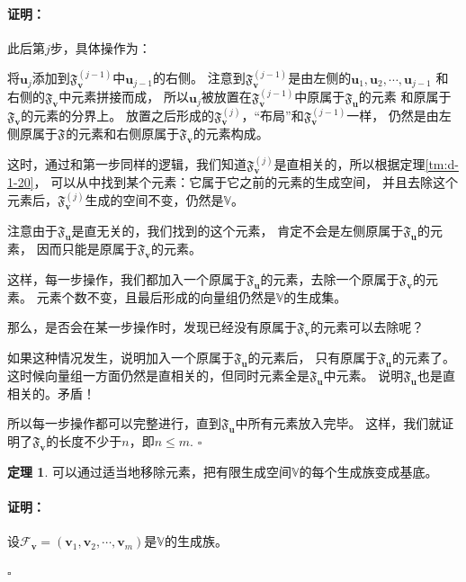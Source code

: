 \documentclass[12pt,UTF8]{ctexbook}
\theoremstyle{definition}
\newtheorem{tm}{定理}[section]
\theoremstyle{plain}
\renewenvironment{proof}{\paragraph{\textbf{证明：}}}{\hfill$\square$}
\begin{document}
\begin{appendix}
\begin{proof}
    此后第$j$步，具体操作为：

    将$\mathbf{u}_j$添加到$\mathfrak{F}_{\mathbf{v}}^{(j-1)}$中$\mathbf{u}_{j-1}$的右侧。
    注意到$\mathfrak{F}_{\mathbf{v}}^{(j-1)}$是由左侧的$\mathbf{u}_1, \mathbf{u}_2, \cdots , \mathbf{u}_{j-1}$
    和右侧的$\mathfrak{F}_{\mathbf{v}}$中元素拼接而成，
    所以$\mathbf{u}_j$被放置在$\mathfrak{F}_{\mathbf{v}}^{(j-1)}$中原属于$\mathfrak{F}_{\mathbf{u}}$的元素
    和原属于$\mathfrak{F}_{\mathbf{v}}$的元素的分界上。
    放置之后形成的$\mathfrak{F}_{\mathbf{v}}^{(j)}$，“布局”和$\mathfrak{F}_{\mathbf{v}}^{(j-1)}$一样，
    仍然是由左侧原属于$\mathfrak{F}_{\mathbf{}}$的元素和右侧原属于$\mathfrak{F}_{\mathbf{v}}$的元素构成。
    
    这时，通过和第一步同样的逻辑，我们知道$\mathfrak{F}_{\mathbf{v}}^{(j)}$是直相关的，所以根据定理\ref{tm:d-1-20}，
    可以从中找到某个元素：它属于它之前的元素的生成空间，
    并且去除这个元素后，$\mathfrak{F}_{\mathbf{v}}^{(j)}$生成的空间不变，仍然是$\mathbb{V}$。

    注意由于$\mathfrak{F}_{\mathbf{u}}$是直无关的，我们找到的这个元素，
    肯定不会是左侧原属于$\mathfrak{F}_{\mathbf{u}}$的元素，
    因而只能是原属于$\mathfrak{F}_{\mathbf{v}}$的元素。

    这样，每一步操作，我们都加入一个原属于$\mathfrak{F}_{\mathbf{u}}$的元素，去除一个原属于$\mathfrak{F}_{\mathbf{v}}$的元素。
    元素个数不变，且最后形成的向量组仍然是$\mathbb{V}$的生成集。

    那么，是否会在某一步操作时，发现已经没有原属于$\mathfrak{F}_{\mathbf{v}}$的元素可以去除呢？

    如果这种情况发生，说明加入一个原属于$\mathfrak{F}_{\mathbf{u}}$的元素后，
    只有原属于$\mathfrak{F}_{\mathbf{u}}$的元素了。
    这时候向量组一方面仍然是直相关的，但同时元素全是$\mathfrak{F}_{\mathbf{u}}$中元素。
    说明$\mathfrak{F}_{\mathbf{u}}$也是直相关的。矛盾！

    所以每一步操作都可以完整进行，直到$\mathfrak{F}_{\mathbf{u}}$中所有元素放入完毕。
    这样，我们就证明了$\mathfrak{F}_{\mathbf{v}}$的长度不少于$n$，即$n \leq m$.
\end{proof}

\begin{tm}\label{tm:d-1-40}
    可以通过适当地移除元素，把有限生成空间$\mathbb{V}$的每个生成族变成基底。
\end{tm}

\begin{proof}
    设$\mathcal{F}_{\mathbf{v}} = (\mathbf{v}_1, \mathbf{v}_2, \cdots , \mathbf{v}_m )$是$\mathbb{V}$的生成族。
    

\end{proof}
\end{appendix}
\end{document}
